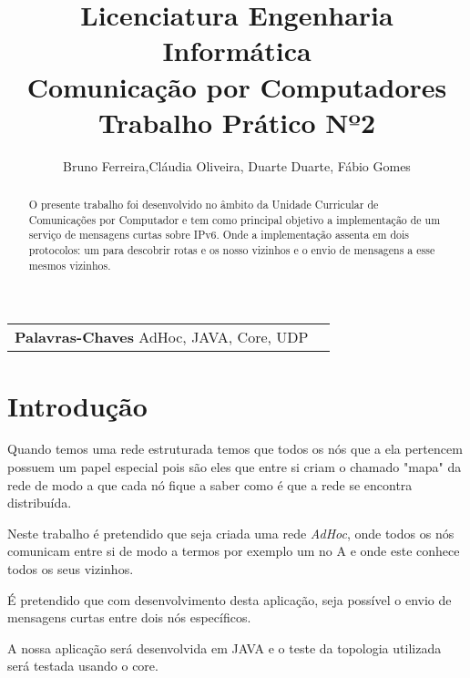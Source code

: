 \documentclass{llncs}
\begin{document}
\title{Licenciatura Engenharia Informática	\\  Comunicação por Computadores  \\ Trabalho Prático Nº2}

\author{Bruno Ferreira,Cláudia Oliveira, Duarte Duarte, Fábio Gomes}



\maketitle


\begin{abstract}

O presente trabalho foi desenvolvido no âmbito da Unidade Curricular de Comunicações por Computador e tem como principal objetivo a implementação de um serviço de mensagens curtas sobre IPv6. Onde a implementação assenta em dois protocolos: um para descobrir rotas e os nosso vizinhos e o envio de mensagens a esse mesmos vizinhos.

\end{abstract}


\begin{tabular}{ll}
\textbf{Palavras-Chaves} AdHoc, JAVA, Core, UDP
\end{tabular}


\smallskip




\section{Introdução}
	Quando temos uma rede estruturada temos que todos os nós que a ela pertencem possuem um papel especial pois são eles que entre si criam o chamado "mapa" da rede de modo a que cada nó fique a saber como é que a rede se encontra distribuída.
	
	Neste trabalho é pretendido que seja criada uma rede \textit{AdHoc}, onde todos os nós comunicam entre si de modo a termos por exemplo um no A e onde este conhece todos os seus vizinhos.
	
	É pretendido que com desenvolvimento desta aplicação, seja possível o envio de mensagens curtas entre dois nós específicos.

	A nossa aplicação será desenvolvida em JAVA e o teste da topologia utilizada será testada usando o core.

\newpage
\end{document}
